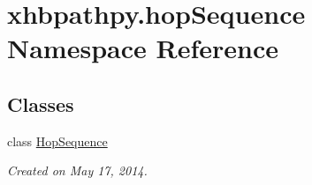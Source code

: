 \hypertarget{namespacexhbpathpy_1_1hop_sequence}{\section{xhbpathpy.\-hop\-Sequence Namespace Reference}
\label{namespacexhbpathpy_1_1hop_sequence}
}
\subsection*{Classes}
\begin{DoxyCompactItemize}
\item 
class \hyperlink{classxhbpathpy_1_1hop_sequence_1_1_hop_sequence}{Hop\-Sequence}
\begin{DoxyCompactList}\small\item\em Created on May 17, 2014. \end{DoxyCompactList}\end{DoxyCompactItemize}

